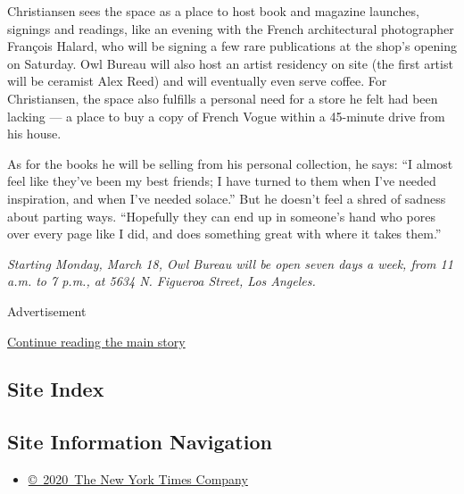 Christiansen sees the space as a place to host book and magazine
launches, signings and readings, like an evening with the French
architectural photographer François Halard, who will be signing a few
rare publications at the shop's opening on Saturday. Owl Bureau will
also host an artist residency on site (the first artist will be ceramist
Alex Reed) and will eventually even serve coffee. For Christiansen, the
space also fulfills a personal need for a store he felt had been lacking
--- a place to buy a copy of French Vogue within a 45-minute drive from
his house.

As for the books he will be selling from his personal collection, he
says: ``I almost feel like they've been my best friends; I have turned
to them when I've needed inspiration, and when I've needed solace.'' But
he doesn't feel a shred of sadness about parting ways. ``Hopefully they
can end up in someone's hand who pores over every page like I did, and
does something great with where it takes them.''

\emph{Starting Monday, March 18, Owl Bureau will be open seven days a
week, from 11 a.m. to 7 p.m., at 5634 N. Figueroa Street, Los Angeles.}

Advertisement

\protect\hyperlink{after-bottom}{Continue reading the main story}

\hypertarget{site-index}{%
\subsection{Site Index}\label{site-index}}

\hypertarget{site-information-navigation}{%
\subsection{Site Information
Navigation}\label{site-information-navigation}}

\begin{itemize}
\tightlist
\item
  \href{https://help.nytimes3xbfgragh.onion/hc/en-us/articles/115014792127-Copyright-notice}{©~2020~The
  New York Times Company}
\end{itemize}

